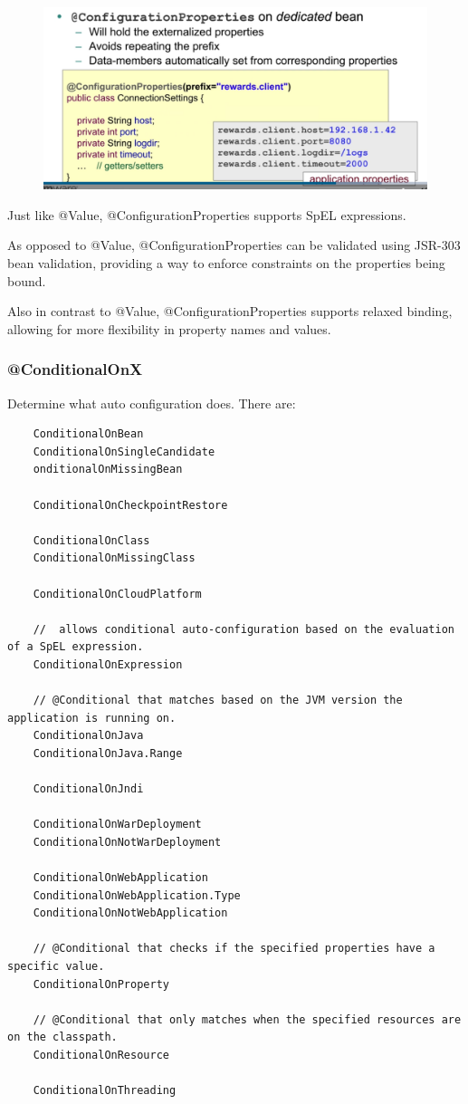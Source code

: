\documentclass{scrartcl}
\begin{document}
\begin{figure}
    \centering
    \includegraphics[width=1\linewidth]{configurationproperties}
    \caption{}
    \label{fig:configurationproperties}
\end{figure}

Just like @Value, @ConfigurationProperties supports SpEL expressions.

As opposed to @Value, @ConfigurationProperties can be validated using JSR-303 bean validation, providing a way to enforce constraints on the properties being bound.

Also in contrast to @Value, @ConfigurationProperties supports relaxed binding, allowing for more flexibility in property names and values.


\subsubsection{@ConditionalOnX}

Determine what auto configuration does. There are:

\begin{lstlisting}
    ConditionalOnBean
    ConditionalOnSingleCandidate
    onditionalOnMissingBean

    ConditionalOnCheckpointRestore

    ConditionalOnClass
    ConditionalOnMissingClass

    ConditionalOnCloudPlatform

    //  allows conditional auto-configuration based on the evaluation of a SpEL expression.
    ConditionalOnExpression

    // @Conditional that matches based on the JVM version the application is running on.
    ConditionalOnJava
    ConditionalOnJava.Range

    ConditionalOnJndi

    ConditionalOnWarDeployment
    ConditionalOnNotWarDeployment

    ConditionalOnWebApplication
    ConditionalOnWebApplication.Type
    ConditionalOnNotWebApplication

    // @Conditional that checks if the specified properties have a specific value.
    ConditionalOnProperty

    // @Conditional that only matches when the specified resources are on the classpath.
    ConditionalOnResource

    ConditionalOnThreading

\end{lstlisting}
\end{document}
